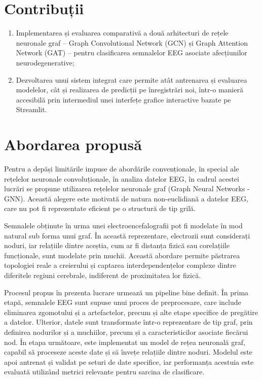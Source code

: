 \documentclass[12pt,a4paper]{report}
\theoremstyle{definition}
\theoremstyle{remark}
\begin{document}
\section{Contribuții}
\begin{enumerate}
    \item Implementarea și evaluarea comparativă a două arhitecturi de rețele neuronale graf -- Graph Convolutional Network (GCN) și Graph Attention Network (GAT) -- pentru clasificarea semnalelor EEG asociate afecțiunilor neurodegenerative;
    \item Dezvoltarea unui sistem integrat care permite atât antrenarea și evaluarea modelelor, cât și realizarea de predicții pe înregistrări noi, într-o manieră accesibilă prin intermediul unei interfețe grafice interactive bazate pe Streamlit.
\end{enumerate}

 \section{Abordarea propusă}

 Pentru a depăși limitările impuse de abordările convenționale, în special ale rețelelor neuronale convoluționale, în analiza datelor EEG, în cadrul acestei lucrări se propune utilizarea rețelelor neuronale graf (Graph Neural Networks - GNN). Această alegere este motivată de natura non-euclidiană a datelor EEG, care nu pot fi reprezentate eficient pe o structură de tip grilă.

 Semnalele obținute în urma unei electroencefalografii pot fi modelate în mod natural sub forma unui graf. În această reprezentare, electrozii sunt considerați noduri, iar relațiile dintre aceștia, cum ar fi distanța fizică sau corelațiile funcționale, sunt modelate prin muchii. Această abordare permite păstrarea topologiei reale a creierului și captarea interdependențelor complexe dintre diferitele regiuni cerebrale, indiferent de proximitatea lor fizică.

 Procesul propus în prezenta lucrare urmează un pipeline bine definit. În prima etapă, semnalele EEG sunt supuse unui proces de preprocesare, care include eliminarea zgomotului și a artefactelor, precum și alte etape specifice de pregătire a datelor. Ulterior, datele sunt transformate într-o reprezentare de tip graf, prin definirea nodurilor și a muchiilor, precum și a caracteristicilor asociate fiecărui nod. În etapa următoare, este implementat un model de rețea neuronală graf, capabil să proceseze aceste date și să învețe relațiile dintre noduri. Modelul este apoi antrenat și validat pe seturi de date specifice, iar performanța acestuia este evaluată utilizând metrici relevante pentru sarcina de clasificare.
\end{document}
